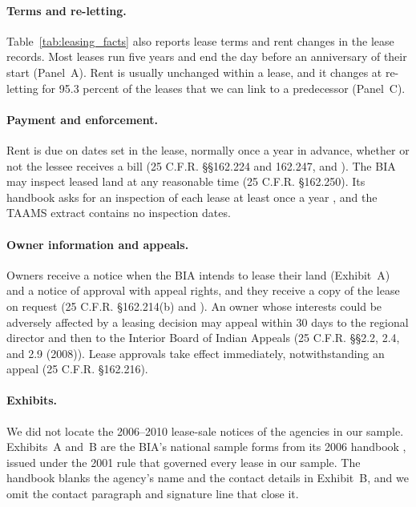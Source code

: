 \documentclass[12pt]{article}
\begin{document}
\paragraph{Terms and re-letting.} Table~\ref{tab:leasing_facts} also reports lease terms and rent changes in the lease records. Most leases run five years and end the day before an anniversary of their start (Panel~A). Rent is usually unchanged within a lease, and it changes at re-letting for 95.3 percent of the leases that we can link to a predecessor (Panel~C).

\paragraph{Payment and enforcement.} Rent is due on dates set in the lease, normally once a year in advance, whether or not the lessee receives a bill (25 C.F.R. \S\S 162.224 and 162.247, and \citealp[Attachment~12A]{BIA2006Ch2}). The BIA may inspect leased land at any reasonable time (25 C.F.R. \S 162.250). Its handbook asks for an inspection of each lease at least once a year \citep[Attachment~5A]{BIA2006Ch2}, and the TAAMS extract contains no inspection dates.

\paragraph{Owner information and appeals.} Owners receive a notice when the BIA intends to lease their land (Exhibit~A) and a notice of approval with appeal rights, and they receive a copy of the lease on request (25 C.F.R. \S 162.214(b) and \citealp[pp.~20--21]{BIA2006Ch2}). An owner whose interests could be adversely affected by a leasing decision may appeal within 30 days to the regional director and then to the Interior Board of Indian Appeals (25 C.F.R. \S\S 2.2, 2.4, and 2.9 (2008)). Lease approvals take effect immediately, notwithstanding an appeal (25 C.F.R. \S 162.216).

\paragraph{Exhibits.} We did not locate the 2006--2010 lease-sale notices of the agencies in our sample. Exhibits~A and~B are the BIA's national sample forms from its 2006 handbook \citep[Attachments~9A and~14A]{BIA2006Ch2}, issued under the 2001 rule that governed every lease in our sample. The handbook blanks the agency's name and the contact details in Exhibit~B, and we omit the contact paragraph and signature line that close it.
\end{document}
